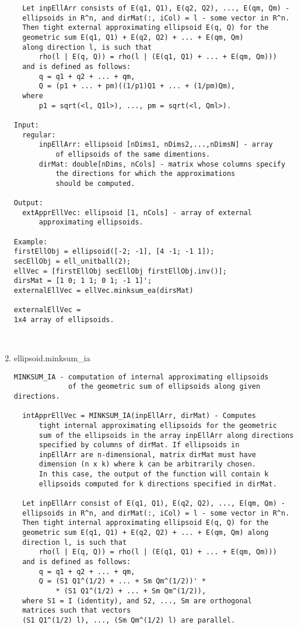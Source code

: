 \begin{enumerate}
\begin{lstlisting}
  Let inpEllArr consists of E(q1, Q1), E(q2, Q2), ..., E(qm, Qm) -
  ellipsoids in R^n, and dirMat(:, iCol) = l - some vector in R^n.
  Then tight external approximating ellipsoid E(q, Q) for the
  geometric sum E(q1, Q1) + E(q2, Q2) + ... + E(qm, Qm)
  along direction l, is such that
      rho(l | E(q, Q)) = rho(l | (E(q1, Q1) + ... + E(qm, Qm)))
  and is defined as follows:
      q = q1 + q2 + ... + qm,
      Q = (p1 + ... + pm)((1/p1)Q1 + ... + (1/pm)Qm),
  where
      p1 = sqrt(<l, Q1l>), ..., pm = sqrt(<l, Qml>).

Input:
  regular:
      inpEllArr: ellipsoid [nDims1, nDims2,...,nDimsN] - array
          of ellipsoids of the same dimentions.
      dirMat: double[nDims, nCols] - matrix whose columns specify
          the directions for which the approximations
          should be computed.

Output:
  extApprEllVec: ellipsoid [1, nCols] - array of external
      approximating ellipsoids.

Example:
firstEllObj = ellipsoid([-2; -1], [4 -1; -1 1]);
secEllObj = ell_unitball(2);
ellVec = [firstEllObj secEllObj firstEllObj.inv()];
dirsMat = [1 0; 1 1; 0 1; -1 1]';
externalEllVec = ellVec.minksum_ea(dirsMat)

externalEllVec =
1x4 array of ellipsoids.



\end{lstlisting}
\fontfamily{\familydefault}
\selectfont
\item {ellipsoid.minksum\_ia}
\selectfont
\begin{lstlisting}
MINKSUM_IA - computation of internal approximating ellipsoids
             of the geometric sum of ellipsoids along given directions.

  intApprEllVec = MINKSUM_IA(inpEllArr, dirMat) - Computes
      tight internal approximating ellipsoids for the geometric
      sum of the ellipsoids in the array inpEllArr along directions
      specified by columns of dirMat. If ellipsoids in
      inpEllArr are n-dimensional, matrix dirMat must have
      dimension (n x k) where k can be arbitrarily chosen.
      In this case, the output of the function will contain k
      ellipsoids computed for k directions specified in dirMat.

  Let inpEllArr consist of E(q1, Q1), E(q2, Q2), ..., E(qm, Qm) -
  ellipsoids in R^n, and dirMat(:, iCol) = l - some vector in R^n.
  Then tight internal approximating ellipsoid E(q, Q) for the
  geometric sum E(q1, Q1) + E(q2, Q2) + ... + E(qm, Qm) along
  direction l, is such that
      rho(l | E(q, Q)) = rho(l | (E(q1, Q1) + ... + E(qm, Qm)))
  and is defined as follows:
      q = q1 + q2 + ... + qm,
      Q = (S1 Q1^(1/2) + ... + Sm Qm^(1/2))' *
          * (S1 Q1^(1/2) + ... + Sm Qm^(1/2)),
  where S1 = I (identity), and S2, ..., Sm are orthogonal
  matrices such that vectors
  (S1 Q1^(1/2) l), ..., (Sm Qm^(1/2) l) are parallel.


\end{lstlisting}
\end{enumerate}
